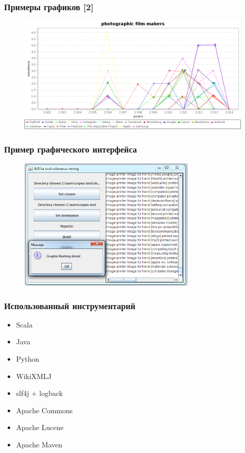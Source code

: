 \documentclass{beamer}
\begin{document}
\begin{frame}\frametitle{Примеры графиков [2]}
\begin{figure}[ht]
\begin{center}
\includegraphics[width=4.5in]{film.png}
\end{center}
\end{figure}
\end{frame}

\begin{frame}\frametitle{Пример графического интерфейса}
\begin{figure}[ht]
\begin{center}
\includegraphics[height=2.5in]{gui.png}
\end{center}
\end{figure}
\end{frame}


\begin{frame}\frametitle{Использованный инструментарий}

\begin{itemize}
    \item Scala
    \item Java
    \item Python
    \item WikiXMLJ
    \item slf4j + logback
    \item Apache Commons
    \item Apache Lucene
    \item Apache Maven
\end{itemize}

\end{frame}
\end{document}
